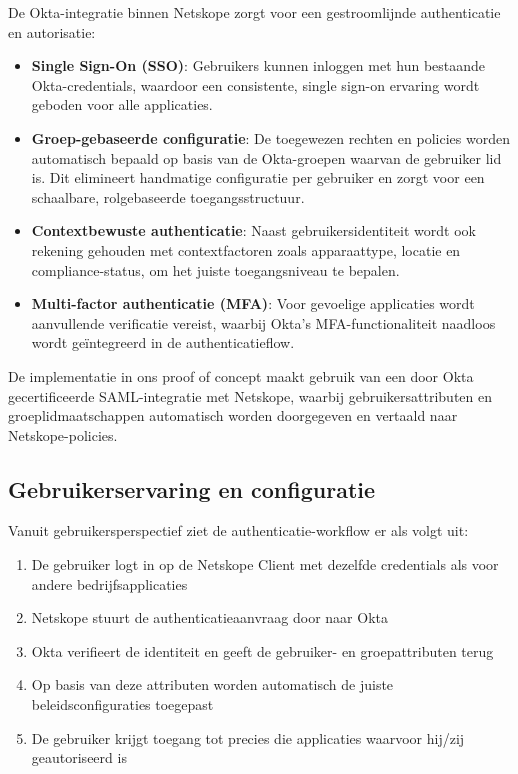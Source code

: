De Okta-integratie binnen Netskope zorgt voor een gestroomlijnde authenticatie en autorisatie:

\begin{itemize}
    \item \textbf{Single Sign-On (SSO)}: Gebruikers kunnen inloggen met hun bestaande Okta-credentials, waardoor een consistente, single sign-on ervaring wordt geboden voor alle applicaties.

    \item \textbf{Groep-gebaseerde configuratie}: De toegewezen rechten en policies worden automatisch bepaald op basis van de Okta-groepen waarvan de gebruiker lid is. Dit elimineert handmatige configuratie per gebruiker en zorgt voor een schaalbare, rolgebaseerde toegangsstructuur.

    \item \textbf{Contextbewuste authenticatie}: Naast gebruikersidentiteit wordt ook rekening gehouden met contextfactoren zoals apparaattype, locatie en compliance-status, om het juiste toegangsniveau te bepalen.

    \item \textbf{Multi-factor authenticatie (MFA)}: Voor gevoelige applicaties wordt aanvullende verificatie vereist, waarbij Okta's MFA-functionaliteit naadloos wordt geïntegreerd in de authenticatieflow.
\end{itemize}

De implementatie in ons proof of concept maakt gebruik van een door Okta gecertificeerde SAML-integratie met Netskope, waarbij gebruikersattributen en groeplidmaatschappen automatisch worden doorgegeven en vertaald naar Netskope-policies.

\subsection{Gebruikerservaring en configuratie}

Vanuit gebruikersperspectief ziet de authenticatie-workflow er als volgt uit:

\begin{enumerate}
    \item De gebruiker logt in op de Netskope Client met dezelfde credentials als voor andere bedrijfsapplicaties
    \item Netskope stuurt de authenticatieaanvraag door naar Okta
    \item Okta verifieert de identiteit en geeft de gebruiker- en groepattributen terug
    \item Op basis van deze attributen worden automatisch de juiste beleidsconfiguraties toegepast
    \item De gebruiker krijgt toegang tot precies die applicaties waarvoor hij/zij geautoriseerd is
\end{enumerate}

